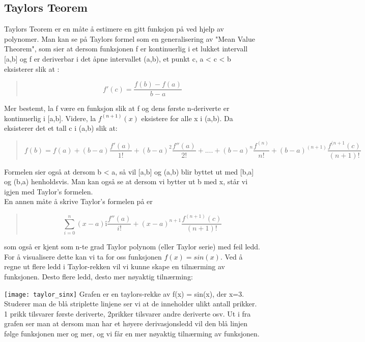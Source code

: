 \subsection{Taylors Teorem}
Taylors Teorem er en måte å estimere en gitt funksjon på ved hjelp av polynomer. Man kan se på Taylors formel som en generalisering av "Mean Value Theorem", som sier at dersom funksjonen f er kontinuerlig i et lukket intervall [a,b] og f er deriverbar i det åpne intervallet (a,b), et punkt c, a < c < b eksisterer slik at :
\begin{quote}
\begin{equation}
f'(c) = \frac{f(b) - f(a)}{b-a}
\end{equation}
\end{quote}
Mer bestemt, la f være en funksjon slik at f og dens første n-deriverte er kontinuerlig i [a,b]. Videre, la $f^{(n+1)}(x)$ eksistere for alle x i (a,b). Da eksisterer det et tall c i (a,b) slik at:
\begin{quote}
\begin{equation}
f(b) = f(a) + (b-a) \frac{f'(a)}{1!} + (b-a)^2 \frac{f''(a)}{2!} + .... + (b-a)^n \frac{f^{(n)}}{n!} + (b-a)^{(n+1)} \frac{f^{(n+1} (c)}{(n+1)!}
\end{equation}
\end{quote}
Formelen sier også at dersom b < a, så vil [a,b] og (a,b) blir byttet ut med [b,a] og (b,a) henholdsvis. Man kan også se at dersom vi bytter ut b med x, står vi igjen med Taylor's formelen. \\
En annen måte å skrive Taylor's formelen på er
\begin{quote}
\begin{equation}
\sum_{i=0}^n (x-a)î \frac{f''(a)}{i!} + (x-a)^{n+1} \frac{f^{(n+1)} (c) }{(n+1)!}
\end{equation}
\end{quote}
som også er kjent som n-te grad Taylor polynom (eller Taylor serie) med feil ledd.\\
For å visualisere dette kan vi ta for oss funksjonen $f(x) = sin(x)$. Ved å regne ut flere ledd i Taylor-rekken vil vi kunne skape en tilnærming av funksjonen. Desto flere ledd, desto mer nøyaktig tilnærming:

\texttt{[image: taylor\_sinx]}
Grafen er en taylors-rekke av f(x) = sin(x), der x=3. Studerer man de blå striplette linjene ser vi at de inneholder ulikt antall prikker. 1 prikk tilsvarer første deriverte, 2prikker tilsvarer andre deriverte osv. Ut i fra grafen ser man at dersom man har et høyere derivasjonsledd vil den blå linjen følge funksjonen mer og mer, og vi får en mer nøyaktig tilnærming av funksjonen. 


